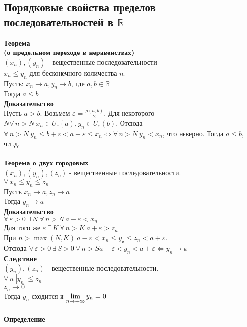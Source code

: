 \documentclass[12pt]{article}
\begin{document}
\subsection{Порядковые свойства пределов последовательностей в $\mathbb{R}$}
\textbf{Теорема\\(о предельном переходе в неравенствах)}\\
$(x_n),(y_n)$ - вещественные последовательности\\
$x_n\leq y_n$ для бесконечного количества $n$.\\
Пусть: $x_n\rightarrow a, y_n \rightarrow b$, где $a,b \in \mathbb{R}$\\
Тогда $a\leq b$\\
\textbf{Доказательство}\\
Пусть $a > b$. Возьмем $\varepsilon = \frac{\rho(a,b)}{2}$. Для некоторого $N \forall\,n>N\ x_n \in U_\varepsilon(a), y_n \in U_\varepsilon(b)$. Отсюда $\forall\,n>N\ y_n \leq b+\varepsilon < a-\varepsilon \leq x_n \Leftrightarrow \forall\,n > N\ y_n < x_n$, что неверно. Тогда $a \leq b$, ч.т.д.\\\\
\textbf{Теорема о двух городовых}\\
$(x_n),(y_n),(z_n)$ - вещественные последовательности.\\
$\forall\,x_n\leq y_n \leq z_n$\\
Пусть $x_n \rightarrow a, z_n \rightarrow a$\\
Тогда $y_n \rightarrow a$\\
\textbf{Доказательство}\\
$\forall\,\varepsilon >0\ \exists\,N\ \forall\,n>N\ a-\varepsilon<x_n$\\
Для того же $\varepsilon\ \exists\,K\ \forall\,n>K\ a+\varepsilon>z_n$\\
При $n>\max(N,K)\ a-\varepsilon<x_n\leq y_n \leq z_n < a+\varepsilon$.\\
Отсюда $\forall\,\varepsilon>0\ \exists\,S>0\ \forall\,n>S a-\varepsilon<y_n<a+\varepsilon \Leftrightarrow y_n\rightarrow a$\\
\textbf{Следствие}\\
$(y_n),(z_n)$ - вещественные последовательности.\\
$\forall\,n\ |y_n|\leq z_n$\\
$z_n \rightarrow 0$\\
Тогда $y_n$ сходится и $\lim\limits_{n\rightarrow +\infty}{y_n}=0$\\\\
\textbf{Определение}\\
\end{document}
